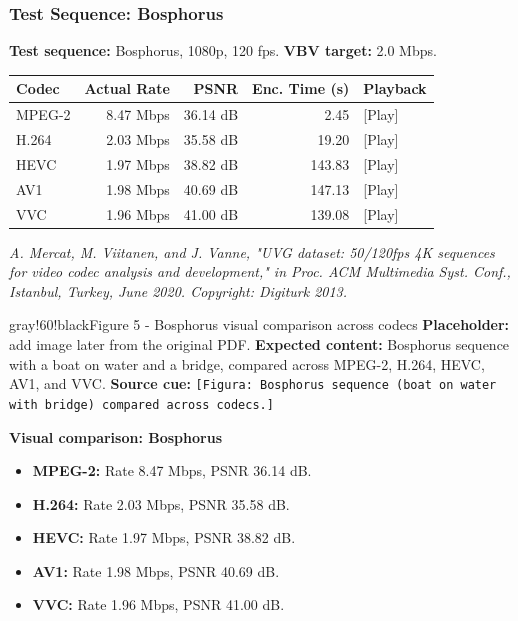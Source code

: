 \subsubsection{Test Sequence: Bosphorus}

\textbf{Test sequence:} Bosphorus, 1080p, 120 fps. \textbf{VBV target:} 2.0 Mbps.

\begin{center}
\begin{tabular}{|l|r|r|r|l|}
\hline
\textbf{Codec} & \textbf{Actual Rate} & \textbf{PSNR} & \textbf{Enc. Time (s)} & \textbf{Playback} \\ \hline
MPEG-2 & 8.47 Mbps & 36.14 dB & 2.45 & [Play] \\ \hline
H.264 & 2.03 Mbps & 35.58 dB & 19.20 & [Play] \\ \hline
HEVC & 1.97 Mbps & 38.82 dB & 143.83 & [Play] \\ \hline
AV1 & 1.98 Mbps & 40.69 dB & 147.13 & [Play] \\ \hline
VVC & 1.96 Mbps & 41.00 dB & 139.08 & [Play] \\ \hline
\end{tabular}
\end{center}

\textit{A. Mercat, M. Viitanen, and J. Vanne, "UVG dataset: 50/120fps 4K sequences for video codec analysis and development," in Proc. ACM Multimedia Syst. Conf., Istanbul, Turkey, June 2020. Copyright: Digiturk 2013.}

\begin{calloutbox}{gray!60!black}{Figure 5 - Bosphorus visual comparison across codecs}
\textbf{Placeholder:} add image later from the original PDF. \textbf{Expected content:} Bosphorus sequence with a boat on water and a bridge, compared across MPEG-2, H.264, HEVC, AV1, and VVC. \textbf{Source cue:} \texttt{[Figura: Bosphorus sequence (boat on water with bridge) compared across codecs.]}
\end{calloutbox}

\textbf{Visual comparison: Bosphorus}

\begin{itemize}
\item \textbf{MPEG-2:} Rate 8.47 Mbps, PSNR 36.14 dB.
\item \textbf{H.264:} Rate 2.03 Mbps, PSNR 35.58 dB.
\item \textbf{HEVC:} Rate 1.97 Mbps, PSNR 38.82 dB.
\item \textbf{AV1:} Rate 1.98 Mbps, PSNR 40.69 dB.
\item \textbf{VVC:} Rate 1.96 Mbps, PSNR 41.00 dB.
\end{itemize}

